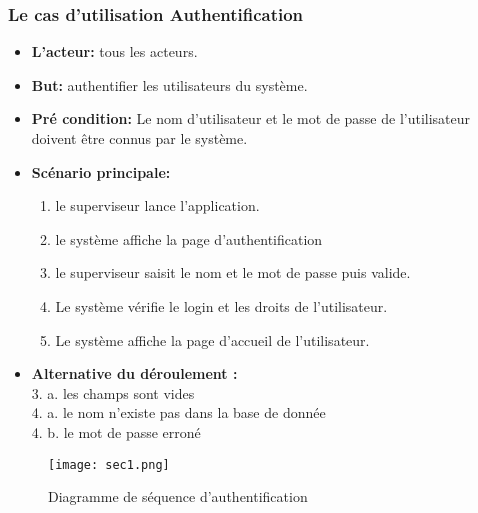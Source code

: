 \subsubsection{ Le cas d'utilisation Authentification }
\begin{itemize}
\item \textbf{L'acteur: }tous les acteurs.
\item \textbf{But: }authentifier les utilisateurs du système.
\item \textbf{Pré condition: }Le nom d'utilisateur et le mot de passe de l'utilisateur doivent être connus par le système.

\item \textbf{Scénario principale: }
\begin{enumerate}
\item le superviseur lance l'application.
\item le système affiche la page d'authentification
\item le superviseur saisit le nom et le mot de passe puis valide.
\item Le système vérifie le login et les droits de l'utilisateur.
\item Le système affiche la page d'accueil de l'utilisateur.
\end{enumerate}
\item \textbf{Alternative du déroulement :\\}
3. a. les champs sont vides\\
4. a. le nom n'existe pas dans la base de donnée\\
4. b. le mot de passe erroné \\
\end{itemize}
\newpage 
\begin{figure}
\centering
  \texttt{[image: sec1.png]}\\
  \caption{Diagramme de séquence d'authentification}
\end{figure}

\newpage 
